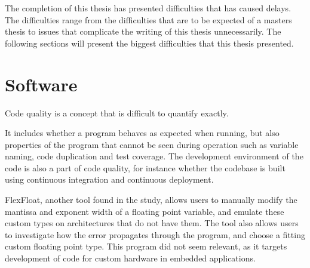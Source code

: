 
The completion of this thesis has presented difficulties that has caused delays. The difficulties range from the difficulties that are to be expected of a masters thesis to issues that complicate the writing of this thesis unnecessarily. The following sections will present the biggest difficulties that this thesis presented. 






\section{Software}
Code quality is a concept that is difficult to quantify exactly.

It includes whether a program behaves as expected when running, but also properties of the program that cannot be seen during operation such as variable naming, code duplication and test coverage.
The development environment of the code is also a part of code quality, for instance whether the codebase is built using
continuous integration and continuous deployment.



FlexFloat, another tool found in the study, allows users to manually modify the mantissa and exponent width of a floating point variable, and emulate these custom types on architectures that do not have them. The tool also allows users to investigate how the error propagates through the program, and choose a fitting custom floating point type. This program did not seem relevant, as it targets development of code for custom hardware in embedded applications.

